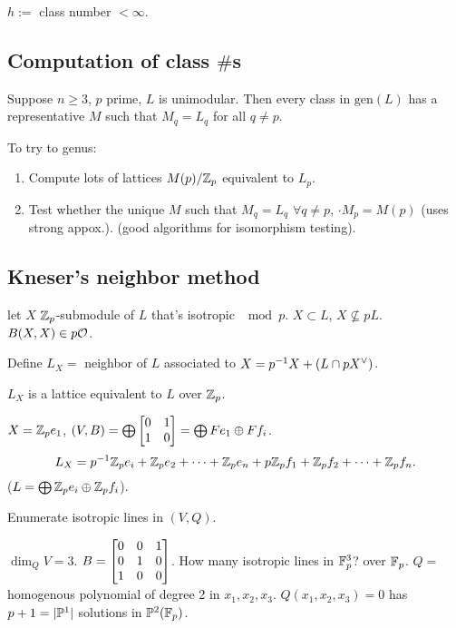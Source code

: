 \documentclass[]{article}
\begin{document}
$h := $ class number $<\infty$.

\subsection*{Computation of class $\#$s}

\begin{theorem}
	Suppose $n\geq 3$, $p$ prime, $L$ is unimodular. Then every class in $\text{gen}(L)$ has a representative $M$ such that $M_q = L_q$ for all $q\neq p$.
\end{theorem}

To try to  genus:
\begin{enumerate}
	\item Compute lots of lattices $M(p)/\mathbb{Z}_p$ equivalent to $L_p$.
	\item Test whether the unique $M$ such that $M_q = L_q$ $\forall q\neq p$, $\cdot M_p = M(p)$ (uses strong appox.). (good algorithms for isomorphism testing).
\end{enumerate}

\subsection*{Kneser's neighbor method}

let $X$ $\mathbb{Z}_p$-submodule of $L$ that's isotropic $\mod p$. $X\subset L$, $X\nsubseteq pL$. $B(X,X)\in p\mathcal{O}$.

\begin{definition}
	Define $L_X = $ neighbor of $L$ associated to $X = p^{-1} X+(L\cap pX^\vee)$.
\end{definition}
\begin{theorem}
	[Kneser] $L_X$ is a lattice equivalent to $L$ over $\mathbb{Z}_p$.
\end{theorem}
\begin{example}
	$X = \mathbb{Z}_p e_1$, $(V,B) = \bigoplus\begin{bmatrix}0&1\\1&0\end{bmatrix} = \bigoplus Fe_1\oplus Ff_i$. $$L_X = p^{-1} \mathbb{Z}_pe_i + \mathbb{Z}_p e_2 + \dots + \mathbb{Z}_p e_n + p\mathbb{Z}_p f_1 + \mathbb{Z}_p f_2 + \dots + \mathbb{Z}_pf_n.$$ ($L = \bigoplus \mathbb{Z}_pe_i\oplus \mathbb{Z}_p f_i$).
\end{example}
Enumerate isotropic lines in $(V,Q)$.
\begin{example}
	$\dim_Q V = 3$. $B = \begin{bmatrix}0&0&1\\0&1&0\\1&0&0\end{bmatrix}$. How many isotropic lines in $\mathbb{F}_p^3$? over $\mathbb{F}_p$. $Q = $ homogenous polynomial of degree 2 in $x_1,x_2,x_3$. $Q(x_1,x_2,x_3) = 0$ has $p+1 = |\mathbb{P}^1|$ solutions in $\mathbb{P}^2(\mathbb{F}_p)$.
\end{example}
\end{document}
